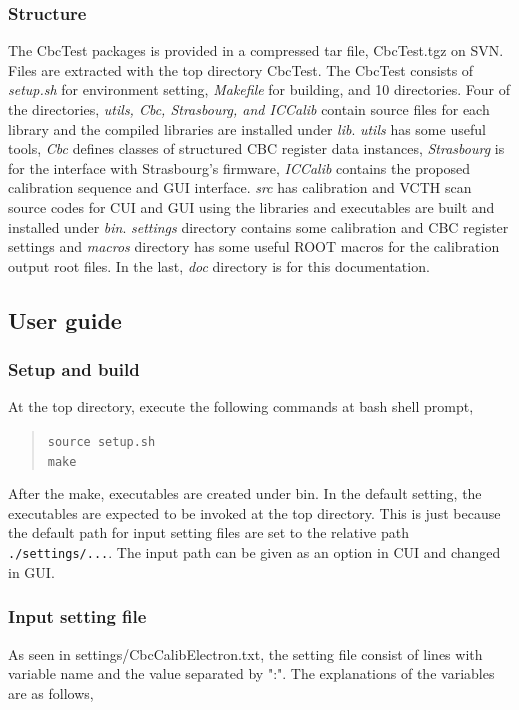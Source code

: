 \documentclass[11pt,a4paper]{article}
\begin{document}
	\subsubsection{Structure}
	The CbcTest packages is provided in a compressed tar file, CbcTest.tgz on SVN. Files are extracted with the top directory CbcTest. 
	The CbcTest consists of {\it setup.sh} for environment setting, {\it Makefile} for building, and 10 directories.  
	Four of the directories, {\it utils, Cbc, Strasbourg, and ICCalib} contain source files for each library and the compiled libraries are installed under {\it lib}.
{\it utils} has some useful tools, {\it Cbc} defines classes of structured CBC register data instances, {\it Strasbourg}  is for the interface with Strasbourg's firmware, {\it ICCalib} contains the proposed calibration sequence and GUI interface.  
{\it src} has calibration and VCTH scan source codes for CUI and GUI using the libraries and executables are built and installed under {\it bin}. 
{\it settings} directory contains some calibration and CBC register settings and {\it macros} directory has some useful ROOT macros for the calibration output root files. 
In the last, {\it doc} directory is for this documentation.   

\subsection{User guide}

\subsubsection{Setup and build}

At the top directory, execute the following commands at bash shell prompt, 
   \begin{quote}
   \verb|source setup.sh|\\
	   \verb|make|
	   \end{quote}
	   After the make, executables are created under bin. In the default setting, the executables are expected to be invoked at the top directory.
	   This is just because the default path for input setting files are set to the relative path \verb|./settings/...|.  The input path can be given as an option
	   in CUI and changed in GUI.

	   \subsubsection{Input setting file}
	   As seen in settings/CbcCalibElectron.txt, the setting file consist of lines with variable name and the value separated by ":".
	   The explanations of the variables are as follows,
\end{document}
